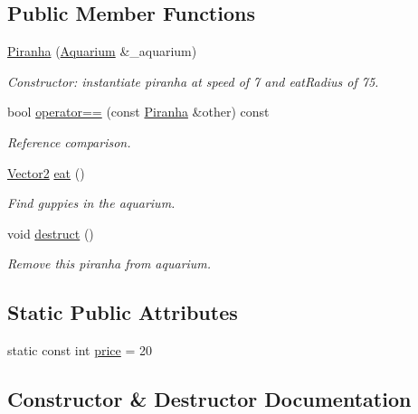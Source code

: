 \subsection*{Public Member Functions}
\begin{DoxyCompactItemize}
\item 
\mbox{\hyperlink{class_piranha_a879b041f0a4bef2e837ee6dab37f7bc8}{Piranha}} (\mbox{\hyperlink{class_aquarium}{Aquarium}} \&\+\_\+aquarium)
\begin{DoxyCompactList}\small\item\em Constructor\+: instantiate piranha at speed of 7 and eat\+Radius of 75. \end{DoxyCompactList}\item 
bool \mbox{\hyperlink{class_piranha_ad374828e737e57a663689f5d54c9cf14}{operator==}} (const \mbox{\hyperlink{class_piranha}{Piranha}} \&other) const
\begin{DoxyCompactList}\small\item\em Reference comparison. \end{DoxyCompactList}\item 
\mbox{\hyperlink{struct_vector2}{Vector2}} \mbox{\hyperlink{class_piranha_a125847235bdbd0e8c676dcada0d86c14}{eat}} ()
\begin{DoxyCompactList}\small\item\em Find guppies in the aquarium. \end{DoxyCompactList}\item 
void \mbox{\hyperlink{class_piranha_a79c586a13bed4fb4aaa1b99c41c93c5a}{destruct}} ()
\begin{DoxyCompactList}\small\item\em Remove this piranha from aquarium. \end{DoxyCompactList}\end{DoxyCompactItemize}
\subsection*{Static Public Attributes}
\begin{DoxyCompactItemize}
\item 
static const int \mbox{\hyperlink{class_piranha_a5cab361b7ab7133245dc8a54a1d8addb}{price}} = 20
\end{DoxyCompactItemize}


\subsection{Constructor \& Destructor Documentation}
\mbox{\label{class_piranha_a879b041f0a4bef2e837ee6dab37f7bc8}} 
